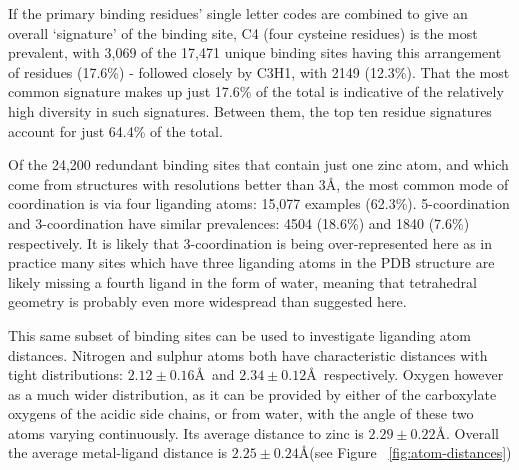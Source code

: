 If the primary binding residues' single letter codes are combined to give an overall `signature' of the binding site, C4 (four cysteine residues) is the most prevalent, with 3,069 of the 17,471 unique binding sites having this arrangement of residues (17.6\%) - followed closely by C3H1, with 2149 (12.3\%). That the most common signature makes up just 17.6\% of the total is indicative of the relatively high diversity in such signatures. Between them, the top ten residue signatures account for just 64.4\% of the total.

Of the 24,200 redundant binding sites that contain just one zinc atom, and which come from structures with resolutions better than 3\AA, the most common mode of coordination is via four liganding atoms: 15,077 examples (62.3\%). 5-coordination and 3-coordination have similar prevalences: 4504 (18.6\%) and 1840 (7.6\%) respectively. It is likely that 3-coordination is being over-represented here as in practice many sites which have three liganding atoms in the PDB structure are likely missing a fourth ligand in the form of water, meaning that tetrahedral geometry is probably even more widespread than suggested here.

This same subset of binding sites can be used to investigate liganding atom distances. Nitrogen and sulphur atoms both have characteristic distances with tight distributions: $2.12\pm0.16$\AA\ and $2.34\pm0.12$\AA\ respectively. Oxygen however as a much wider distribution, as it can be provided by either of the carboxylate oxygens of the acidic side chains, or from water, with the angle of these two atoms varying continuously. Its average distance to zinc is $2.29\pm0.22$\AA. Overall the average metal-ligand distance is $2.25\pm0.24$\AA (see Figure ~\ref{fig:atom-distances})

